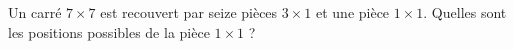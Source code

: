 Un carré $7 \times 7$ est recouvert par seize pièces $3 \times 1$ et une pièce $1 \times 1$. Quelles sont les positions possibles de la pièce $1 \times 1$ ?
